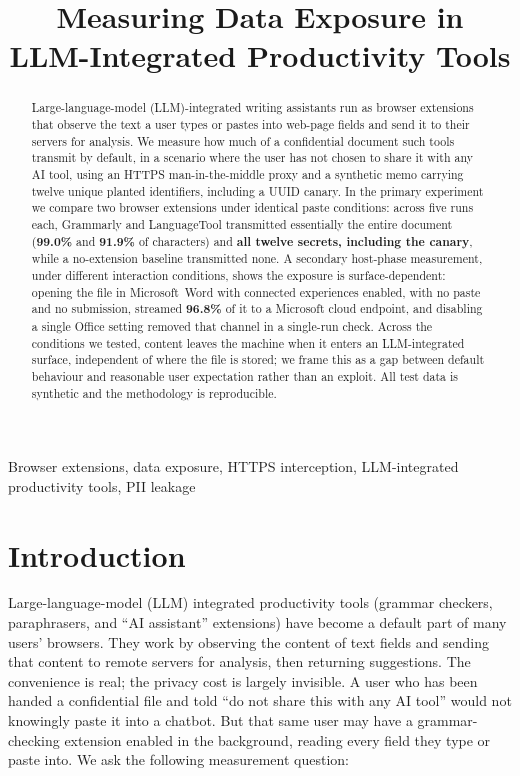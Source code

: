\documentclass[10pt,conference,a4paper]{IEEEtran}
\title{Measuring Data Exposure in\\ LLM-Integrated Productivity Tools}
\author{\IEEEauthorblockN{Marawan Eldeib}
\IEEEauthorblockA{Matrikelnummer:~3764796\\
University of Stuttgart\\
Supervisor: Prof.\ Dr.\ Marco Aiello\\
\today}}
\begin{document}
\maketitle
\thispagestyle{plain}
\pagestyle{plain}

\begin{abstract}
\noindent
Large-language-model (LLM)-integrated writing assistants run as browser extensions that
observe the text a user types or pastes into web-page fields and send it to their
servers for analysis. We measure how much of a confidential document such tools transmit by
default, in a scenario where the user has not chosen to share it with any AI tool, using an
HTTPS man-in-the-middle proxy and a synthetic memo carrying twelve unique planted
identifiers, including a UUID canary. In the primary experiment we compare two browser
extensions under identical paste conditions: across five runs each, Grammarly and
LanguageTool transmitted essentially the entire document (\textbf{99.0\%} and
\textbf{91.9\%} of characters) and \textbf{all twelve secrets, including the canary}, while
a no-extension baseline transmitted none. A secondary host-phase measurement, under
different interaction conditions, shows the exposure is surface-dependent: opening the file
in Microsoft~Word with connected experiences enabled, with no paste and no submission,
streamed \textbf{96.8\%} of it to a Microsoft cloud endpoint, and disabling a single Office
setting removed that channel in a single-run check. Across the conditions we tested, content
leaves the machine when it enters an
LLM-integrated surface, independent of where the file is stored; we frame this as a gap
between default behaviour and reasonable user expectation rather than an exploit. All test
data is synthetic and the methodology is reproducible.
\end{abstract}

\begin{IEEEkeywords}
Browser extensions, data exposure, HTTPS interception, LLM-integrated productivity
tools, PII leakage
\end{IEEEkeywords}

\section{Introduction}

Large-language-model (LLM) integrated productivity tools (grammar checkers,
paraphrasers, and ``AI assistant'' extensions) have become a default part of many
users' browsers. They work by observing the content of text fields and sending that
content to remote servers for analysis, then returning suggestions. The convenience is
real; the privacy cost is largely invisible. A user who has been handed a confidential
file and told ``do not share this with any AI tool'' would not knowingly paste it into
a chatbot. But that same user may have a grammar-checking extension enabled in the
background, reading every field they type or paste into. We ask the following measurement
question:
\end{document}
